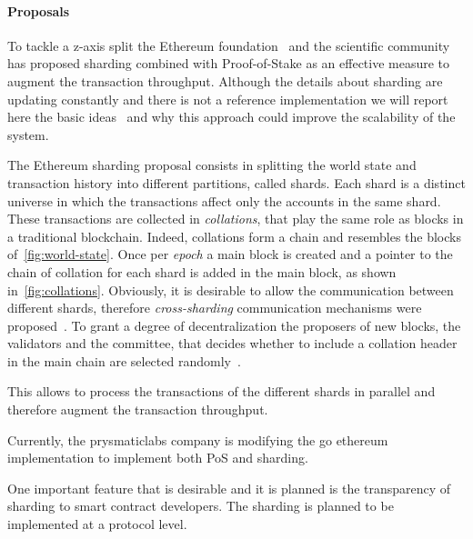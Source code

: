 \paragraph{Proposals} To tackle a z-axis split the Ethereum 
foundation~\cite{bib:mauve} and the scientific 
community~\cite{bib:scaling-croman} has proposed sharding combined with
Proof-of-Stake as an effective measure to augment the transaction throughput.
Although the details about sharding are updating constantly and there is not
a reference implementation we will report here the basic ideas~\cite{bib:mauve,bib:sharding-faq} and why this
approach could improve the scalability of the system.

The Ethereum sharding proposal consists in splitting the world state and
transaction history into different partitions, called shards.
Each shard is a distinct universe in which the transactions affect only the 
accounts in the same shard. These transactions are collected in 
\emph{collations}, that play the same role as blocks in a traditional  
blockchain. Indeed, collations form a chain and resembles the blocks 
of~\autoref{fig:world-state}. Once per \emph{epoch} a main block is created
and a pointer to the chain of collation for each shard is added in the main
block, as shown in~\autoref{fig:collations}.
Obviously, it is desirable to allow the communication between different shards,
therefore \emph{cross-sharding} communication mechanisms were 
proposed~\cite{bib:sharding-faq}. To grant a degree of decentralization the 
proposers of new blocks, the validators and the committee, that decides whether 
to include a collation header in the main chain are selected randomly~\cite{}.

This allows to process the transactions of the different shards in parallel
and therefore augment the transaction throughput.




Currently, the prysmaticlabs company is modifying the go ethereum implementation
to implement both PoS and sharding.

One important feature that is desirable and it is planned is the transparency
of sharding to smart contract developers. The sharding is planned to be 
implemented at a protocol level.



